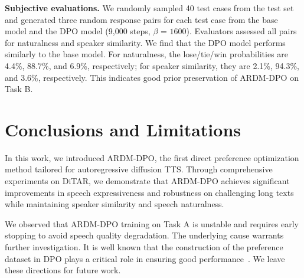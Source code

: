 \documentclass{article}
\begin{document}
\noindent
\textbf{Subjective evaluations.} We randomly sampled 40 test cases from the test set and generated three random response pairs for each test case from the base model and the DPO model (9,000 steps, $\beta\text{ = 1600}$). Evaluators assessed all pairs for naturalness and speaker similarity. We find that the DPO model performs similarly to the base model. For naturalness, the lose/tie/win probabilities are 4.4\%, 88.7\%, and 6.9\%, respectively; for speaker similarity, they are 2.1\%, 94.3\%, and 3.6\%, respectively. This indicates good prior preservation of ARDM-DPO on Task B.

\section{Conclusions and Limitations}
\label{sec:conclusion}

In this work, we introduced ARDM-DPO, the first direct preference optimization method tailored for autoregressive diffusion TTS. Through comprehensive experiments on DiTAR, we demonstrate that ARDM-DPO achieves significant improvements in speech expressiveness and robustness on challenging long texts while maintaining speaker similarity and speech naturalness.

We observed that ARDM-DPO training on Task A is unstable and requires early stopping to avoid speech quality degradation. The underlying cause warrants further investigation. It is well known that the construction of the preference dataset in DPO plays a critical role in ensuring good performance~\cite{Tango2,TTSDPO,INTP}. We leave these directions for future work.




\end{document}
